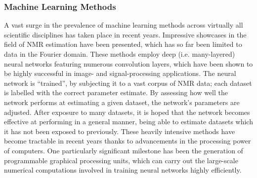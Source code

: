 \subsubsection{Machine Learning Methods}
A vast surge in the prevalence of machine learning methods across virtually
all scientific disciplines has taken place in recent years.
Impressive showcases in the field of \ac{NMR} estimation have been
presented, which has so far been limited to data in the
Fourier domain\cite{Li2021,Schmid2023}.
These methods employ deep (i.e. many-layered) neural
networks featuring numerous convolution layers, which have been shown to be
highly successful in image- and signal-processing applications\cite{Lecun1998}.
The neural network is ``trained'', by subjecting it to a vast corpus of
\ac{NMR} data; each dataset is labelled with the correct parameter
estimate. By assessing how well the network performs at estimating a given
dataset, the network's parameters are adjusted. After exposure to
many datasets, it is hoped that the network becomes
effective at performing in a general manner, being able to estimate datasets
which it has not been exposed to previously.
These heavily intensive methods have become tractable in recent years thanks to
advancements in the processing power of computers. One particularly significant
milestone has been the generation of programmable graphical processing
units, which can carry out the large-scale numerical computations involved in
training neural networks highly efficiently.
